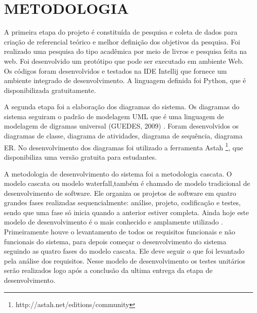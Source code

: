 \documentclass[openright]{ifrs} %
\begin{document}
\chapter{METODOLOGIA}
A primeira etapa do projeto é constituída de pesquisa e coleta de dados para criação de referencial teórico e melhor definição dos objetivos da pesquisa. Foi realizado uma pesquisa do tipo acadêmica por meio de livros e pesquisa feita na web. Foi desenvolvido um protótipo que pode ser executado em ambiente Web. Os códigos foram desenvolvidos e testados na IDE Intellij que fornece um ambiente integrado de desenvolvimento. A linguagem definida foi Python, que é disponibilizada gratuitamente.

A segunda etapa foi a elaboração dos diagramas do sistema. Os diagramas do sistema seguiram o padrão de modelagem UML que é uma linguagem de modelagem de digramas universal  (GUEDES, 2009) . Foram desenvolvidos os diagramas de classe, diagrama de atividades, diagrama de sequência, diagrama ER. No desenvolvimento dos diagramas foi utilizado a ferramenta Astah \footnote{http://astah.net/editions/community}, que disponibiliza uma versão gratuita para estudantes.

A metodologia de desenvolvimento do sistema foi a metodologia cascata. O modelo cascata ou modelo waterfall,também é chamado de modelo tradicional de desenvolvimento de software. Ele organiza os projetos de software em quatro grandes fases realizadas sequencialmente: análise, projeto, codificação e testes, sendo que uma fase só inicia quando a anterior estiver completa. Ainda hoje este modelo de desenvolvimento é o mais conhecido e amplamente utilizado \cite{pressman2016engenharia}. Primeiramente houve o levantamento de todos os requisitos funcionais e não funcionais do sistema, para depois começar o desenvolvimento do sistema seguindo as quatro fases do modelo cascata. Ele deve seguir o que foi levantado pela análise dos requisitos. Nesse modelo de desenvolvimento os testes unitários serão realizados logo após a conclusão da ultima entrega da etapa de desenvolvimento.
\end{document}
